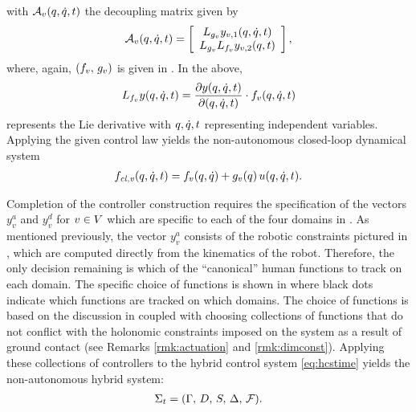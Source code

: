 with $\mathcal{A}_{v}(q, \dot{q}, t)$ the decoupling matrix given by
\begin{align*}
  \mathcal{A}_{v}(q, \dot{q}, t) =
  \left[\begin{array}{c}
      L_{g_{v}} y_{v,1} (q, \dot{q}, t)\\
      L_{g_{v}} L_{f_{v}} y_{v,2}(q, t)
    \end{array}\right],
\end{align*}
where, again, $(f_{v}, \, g_{v})$ is given in .
%
In the above,
\begin{align*}
  L_{f_{v}} y(q, \dot{q}, t) = \frac{\partial{y(q, \dot{q}, t)}}{\partial{(q, \dot{q}, t)}} \cdot
  f_{v}(q, \dot{q}, t)
\end{align*}
represents the Lie derivative with $q, \dot{q}, t$ representing independent
variables.
Applying the given control law yields the non-autonomous closed-loop dynamical
system
\begin{align}
  \label{eq:clsys}
  f_\mathit{cl,v}(q, \dot{q}, t) = f_{v}(q, \dot{q}) + g_{v}(q) \, u(q, \dot{q}, t).
\end{align}

Completion of the controller construction requires the specification of the
vectors $y^{a}_{v}$ and $y^{d}_{v}$ for $v \in V$ which are specific to each
of the four domains in .
%
As mentioned previously, the vector $y^a_v$ consists of the robotic constraints
pictured in , which are computed directly from the
kinematics of the robot.
%
Therefore, the only decision remaining is which of the ``canonical'' human
functions to track on each domain.
%
The specific choice of functions is shown in  where black
dots indicate which functions are tracked on which domains.
%
The choice of functions is based on the discussion in 
coupled with choosing collections of functions that do not conflict with the
holonomic constraints imposed on the system as a result of ground contact (see
Remarks \ref{rmk:actuation} and \ref{rmk:dimconst}).
%
Applying these collections of controllers to the hybrid control system
\eqref{eq:hcstime} yields the non-autonomous hybrid system:
%
\begin{align}
  \label{eq:hstime}
  \Sigma_{t} = (\Gamma, \, D, \, S, \, \Delta, \, \mathcal{F}).
\end{align}

